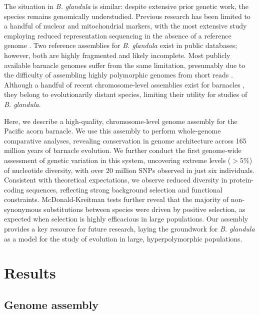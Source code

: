 \documentclass[11pt]{article}
\newcommand{\bgla}{\textit{B. glandula}\xspace}
\begin{document}
The situation in \bgla{} is similar: despite extensive prior genetic work,
the species remains genomically understudied. Previous research has been limited to a
handful of nuclear and mitochondrial markers, with the
most extensive study employing reduced representation sequencing in the
absence of a reference genome \citep{wares_diversity_2021}. Two reference assemblies
for \bgla{} exist in public databases; however, both are
highly fragmented and likely incomplete. Most publicly available barnacle genomes
suffer from the same limitation, presumably due to the difficulty of assembling
highly polymorphic genomes from short reads \citep{vinson_assembly_2005,
kajitani_efficient_2014}. Although a handful of recent chromosome-level assemblies exist
for barnacles \citep{han_new_2024,bishop_genome_2025,bernot_chromosome-level_2022,
carlson_reference_2025,blaxter_genome_2023}, they belong to evolutionarily distant species,
limiting their utility for studies of \bgla{}.
\vspace{0.2cm}

Here, we describe a high-quality, chromosome-level genome assembly for the
Pacific acorn barnacle. We use this assembly to perform whole-genome comparative
analyses, revealing conservation in genome architecture across 165 million years
of barnacle evolution. We further conduct the first genome-wide assessment of
genetic variation in this system, uncovering extreme levels ($>5\%$) of nucleotide
diversity, with over 20 million SNPs observed in just six individuals.
Consistent with theoretical expectations, we observe reduced diversity in
protein-coding sequences, reflecting strong background selection and functional
constraints. McDonald-Kreitman tests further reveal that the majority of
non-synonymous substitutions between species were driven by positive selection,
as expected when selection is highly efficacious in large
populations. Our assembly provides a key resource for future research, laying
the groundwork for \bgla{} as a model for the study of evolution
in large, hyperpolymorphic populations.
\vspace{0.2cm}

\section*{Results}

\subsection*{Genome assembly}
\end{document}
